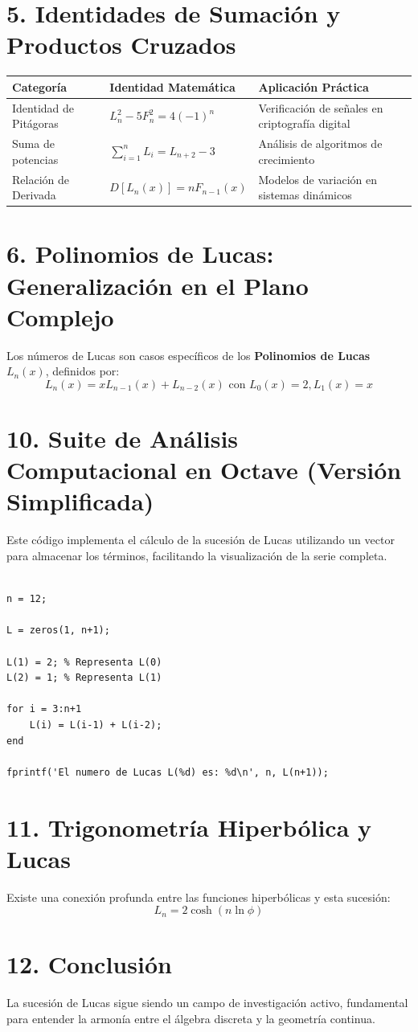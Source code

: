\documentclass[11pt]{article}
\begin{document}
\section*{5. Identidades de Sumación y Productos Cruzados}
\begin{center}
\renewcommand{\arraystretch}{1.5}
\begin{tabular}{|l|l|l|}
\hline
\rowcolor{seccionColor!10} \textbf{Categoría} & \textbf{Identidad Matemática} & \textbf{Aplicación Práctica} \\ \hline
Identidad de Pitágoras & $L_n^2 - 5F_n^2 = 4(-1)^n$ & Verificación de señales en criptografía digital \\ \hline
Suma de potencias & $\sum_{i=1}^{n} L_i = L_{n+2} - 3$ & Análisis de algoritmos de crecimiento \\ \hline
Relación de Derivada & $D[L_n(x)] = n F_{n-1}(x)$ & Modelos de variación en sistemas dinámicos \\ \hline
\end{tabular}
\end{center}

\section*{6. Polinomios de Lucas: Generalización en el Plano Complejo}
Los números de Lucas son casos específicos de los \textbf{Polinomios de Lucas} $L_n(x)$, definidos por:
{\color{colorFormula}
\[ L_n(x) = x L_{n-1}(x) + L_{n-2}(x) \text{ con } L_0(x)=2, L_1(x)=x \]}

\section*{10. Suite de Análisis Computacional en Octave (Versión Simplificada)}
Este código implementa el cálculo de la sucesión de Lucas utilizando un vector para almacenar los términos, facilitando la visualización de la serie completa.

\begin{lstlisting}

n = 12; 

L = zeros(1, n+1);

L(1) = 2; % Representa L(0)
L(2) = 1; % Representa L(1)

for i = 3:n+1
    L(i) = L(i-1) + L(i-2);
end

fprintf('El numero de Lucas L(%d) es: %d\n', n, L(n+1));
\end{lstlisting}

\section*{11. Trigonometría Hiperbólica y Lucas}
Existe una conexión profunda entre las funciones hiperbólicas y esta sucesión:
{\color{colorFormula}
\[ L_n = 2 \cosh(n \ln \phi) \]}

\section*{12. Conclusión}
La sucesión de Lucas sigue siendo un campo de investigación activo, fundamental para entender la armonía entre el álgebra discreta y la geometría continua.
\end{document}
